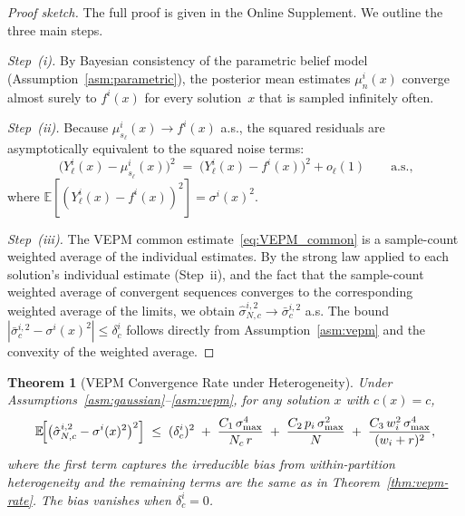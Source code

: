 \documentclass[12pt]{article}
\theoremstyle{plain}
\newtheorem{theorem}{Theorem}[section]
\theoremstyle{definition}
\theoremstyle{remark}
\begin{document}
\begin{proof}[Proof sketch]
The full proof is given in the Online Supplement.  We outline the three
main steps.

\emph{Step~(i).}
By Bayesian consistency of the parametric belief model
(Assumption~\ref{asm:parametric}), the posterior mean estimates
$\mu_{n}^{i}(x)$ converge almost surely to $f^{i}(x)$ for every
solution~$x$ that is sampled infinitely often.

\emph{Step~(ii).}
Because $\mu_{s_{\ell}}^{i}(x)\to f^{i}(x)$ a.s., the squared residuals
are asymptotically equivalent to the squared noise terms:
\[
  \bigl(Y_{\ell}^{i}(x)-\mu_{s_{\ell}}^{i}(x)\bigr)^{2}
  \;=\; \bigl(Y_{\ell}^{i}(x)-f^{i}(x)\bigr)^{2} + o_{\ell}(1)
  \qquad\text{a.s.,}
\]
where $\mathbb{E}[(Y_{\ell}^{i}(x)-f^{i}(x))^{2}]=\sigma^{i}(x)^{2}$.

\emph{Step~(iii).}
The VEPM common estimate~\eqref{eq:VEPM_common} is a sample-count
weighted average of the individual estimates.  By the strong law applied
to each solution's individual estimate (Step~ii), and the fact that the
sample-count weighted average of convergent sequences converges to the
corresponding weighted average of the limits, we obtain
$\hat{\sigma}_{N,c}^{i,2} \to \bar{\sigma}_{c}^{i,2}$ a.s.
The bound $|\bar{\sigma}_{c}^{i,2} - \sigma^{i}(x)^{2}| \le \delta_{c}^{i}$
follows directly from Assumption~\ref{asm:vepm} and the convexity of the
weighted average.
\end{proof}

\begin{theorem}[VEPM Convergence Rate under Heterogeneity]\label{thm:vepm-rate-relaxed}
Under Assumptions~\ref{asm:gaussian}--\ref{asm:vepm}, for any solution $x$ with $c(x) = c$,
\[
  \mathbb{E}\!\Bigl[
    \bigl(\hat{\sigma}_{N,c}^{i,2}-\sigma^{i}(x)^{2}\bigr)^{2}
  \Bigr]
  \;\le\;
  (\delta_{c}^{i})^{2}
  \;+\;
  \frac{C_{1}\,\sigma_{\max}^{4}}{N_{c}\,r}
  \;+\;
  \frac{C_{2}\,p_{i}\,\sigma_{\max}^{2}}{N}
  \;+\;
  \frac{C_{3}\,w_{i}^{2}\,\sigma_{\max}^{4}}{(w_{i}+r)^{2}},
\]
where the first term captures the irreducible bias from within-partition
heterogeneity and the remaining terms are the same as in
Theorem~\ref{thm:vepm-rate}.  The bias vanishes when
$\delta_{c}^{i} = 0$.
\end{theorem}
\end{document}
